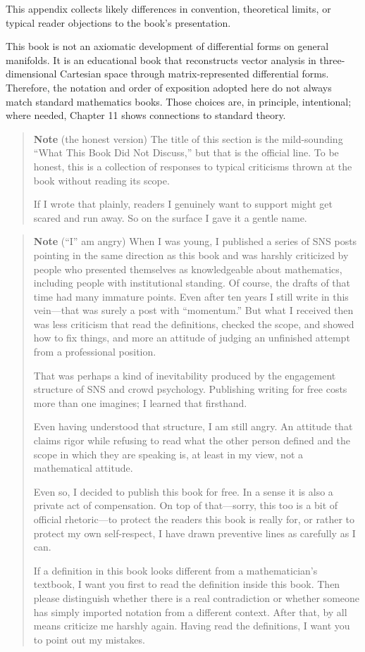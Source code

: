 This appendix collects likely differences in convention, theoretical
limits, or typical reader objections to the book's presentation.

This book is not an axiomatic development of differential forms on
general manifolds. It is an educational book that reconstructs vector
analysis in three-dimensional Cartesian space through matrix-represented
differential forms. Therefore, the notation and order of exposition
adopted here do not always match standard mathematics books. Those
choices are, in principle, intentional; where needed, Chapter 11 shows
connections to standard theory.

\begin{quote}
\textbf{Note} (the honest version) The title of this section is the
mild-sounding ``What This Book Did Not Discuss,'' but that is the
official line. To be honest, this is a collection of responses to
typical criticisms thrown at the book without reading its scope.

If I wrote that plainly, readers I genuinely want to support might get
scared and run away. So on the surface I gave it a gentle name.
\end{quote}

\begin{quote}
\textbf{Note} (``I'' am angry) When I was young, I published a series of
SNS posts pointing in the same direction as this book and was harshly
criticized by people who presented themselves as knowledgeable about
mathematics, including people with institutional standing. Of course,
the drafts of that time had many immature points. Even after ten years I
still write in this vein---that was surely a post with ``momentum.'' But
what I received then was less criticism that read the definitions,
checked the scope, and showed how to fix things, and more an attitude of
judging an unfinished attempt from a professional position.

That was perhaps a kind of inevitability produced by the engagement
structure of SNS and crowd psychology. Publishing writing for free costs
more than one imagines; I learned that firsthand.

Even having understood that structure, I am still angry. An attitude
that claims rigor while refusing to read what the other person defined
and the scope in which they are speaking is, at least in my view, not a
mathematical attitude.

Even so, I decided to publish this book for free. In a sense it is also
a private act of compensation. On top of that---sorry, this too is a bit
of official rhetoric---to protect the readers this book is really for,
or rather to protect my own self-respect, I have drawn preventive lines
as carefully as I can.

If a definition in this book looks different from a mathematician's
textbook, I want you first to read the definition inside this book. Then
please distinguish whether there is a real contradiction or whether
someone has simply imported notation from a different context. After
that, by all means criticize me harshly again. Having read the
definitions, I want you to point out my mistakes.
\end{quote}

